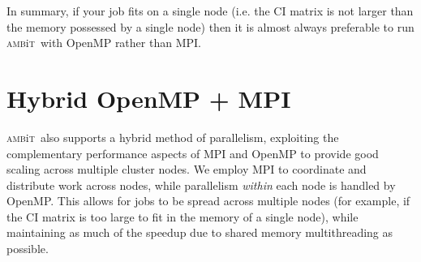\documentclass{report}
\newcommand{\ambit}{\textsc{amb}{\footnotesize i}\textsc{t}}
\begin{document}

In summary, if your job fits on a single node (i.e. the CI matrix is not larger than the 
memory possessed by a single node) then it is almost always preferable to run \ambit\ with OpenMP rather 
than MPI.

\section{Hybrid OpenMP + MPI}
\label{sec:hybrid}

\ambit\ also supports a hybrid method of parallelism, exploiting the complementary performance aspects of
MPI and OpenMP to provide good scaling across multiple cluster nodes. We employ MPI to coordinate and
distribute work across nodes, while parallelism \emph{within} each node is handled by OpenMP. This allows
for jobs to be spread across multiple nodes (for example, if the CI matrix is too large to fit in the
memory of a single node), while maintaining as much of the speedup due to shared memory multithreading as
possible. 
\end{document}
